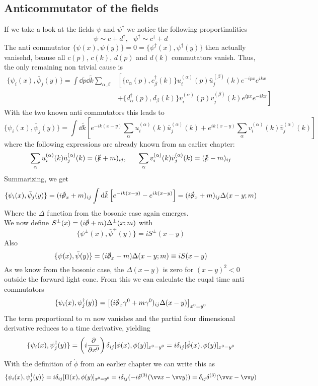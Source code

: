\subsection{Anticommutator of the fields}
If we take a look at the fields $ \psi$ and $\psi^\dagger$ we notice the following proportinalities
\[\psi \sim c+d^\dagger, ~~~ \psi^\dagger \sim c^\dagger + d \]
The anti commutator $\{ \psi(x), \psi(y)\} = 0 = \{\psi^\dagger(x), \psi^\dagger(y)\}$ then actually vanisehd, beause all $ c(p)$, $ c(k)$, $d(p)$ and $d(k)$ commutators vanish.
Thus, the only remaining non trivial cause is
\begin{align*} 
\{\psi_i(x), \bar \psi_j(y)\} = \int \dd \tilde p \dd \tilde k \sum_{\alpha, \beta}& \left[ \{ c_\alpha(p), c^\dagger_\beta(k) \} u_i^{(\alpha)} (p) \bar u_j^{(\beta)}(k) e^{-ipx}e^{ikx}\right. \\
&+ \left. \{ d^\dagger_\alpha(p), d_\beta(k) \} v_i^{(\alpha)}(p)\bar v_j^{(\beta)} (k) e^{ipx} e^{-ikx} \right]
\end{align*}
With the two known anti commutators this leads to
\[ \{\psi_i(x), \bar \psi_j(y)\} =  \int \dd \tilde k \left[ e^{-ik(x-y)} \sum_\alpha u^{(\alpha)}_i (k) \bar u_j^{(\alpha)}(k) + e^{ik(x-y)} \sum_\alpha v_i^{(\alpha)}(k) \bar v_j^{(\alpha)}(k) \right]\]
where the following expressions are already known from an earlier chapter:
\[\sum_\alpha u_i^{(\alpha)} (k) \bar u_j^{(\alpha)}(k) = (\slashed k + m)_{ij}, ~~~~~ \sum_\alpha v_i^{(\alpha)} (k) \bar v_j^{(\alpha)}(k) = ( \slashed k - m)_{ij}\]
Summarizing, we get
\[ \{\psi_i(x), \bar \psi_j(y)\} = (i \slashed \p_x + m)_{ij} \int \dd \tilde k \left[ e^{-ik(x-y)} - e^{ik(x-y)}\right] = (i\slashed \p_x +m )_{ij} \Delta(x-y;m)\]
Where the $\Delta$ function from the bosonic case again emerges.\\
We now define $ S^\pm(x) = (i \slashed \p + m) \Delta^\pm(x;m)$ with
\[ \{ \psi^\pm(x), \bar \psi^\mp(y)\} = i S^\pm(x-y)\]
Also
\[ \{\psi(x), \bar \psi(y)\} = (i \slashed \p_x + m) \Delta(x-y;m) \equiv i S(x-y)\]
As we know from the bosonic case, the $\Delta(x-y)$ is zero for $(x-y)^2 <0$ outside the forward light cone.
From this we can calculate the euqal time anti commutators
\[ \{\psi_i(x), \psi_j^\dagger(y)\} = \left[ ( i \slashed \p_x \gamma^0 + m\gamma^0)_{ij} \Delta(x-y)\right]_{x^0 = y^0}\]
The term proportional to $m$ now vanishes and the partial four dimensional derivative reduces to a time derivative, yielding
\[ \{\psi_i(x), \psi_j^\dagger(y)\} = \left( i \frac{\partial}{\partial x^0}\right) \delta_{ij} [\phi(x), \phi(y)]_{x^0 = y^0} = i \delta_{ij} [\dot \phi(x), \phi(y)]_{x^0 = y^0}\]
With the definition of $\dot \phi$ from an earlier chapter we can write this as
\[ \{\psi_i(x), \psi_j^\dagger(y)\} = i \delta_{ij} [ \Pi(x), \phi(y)]_{x^0 = y^0} = i \delta_{ij} (-i \delta^{(3)}(\vx - \vy)) = \delta_{ij} \delta^{(3)}(\vx - \vy)\]

